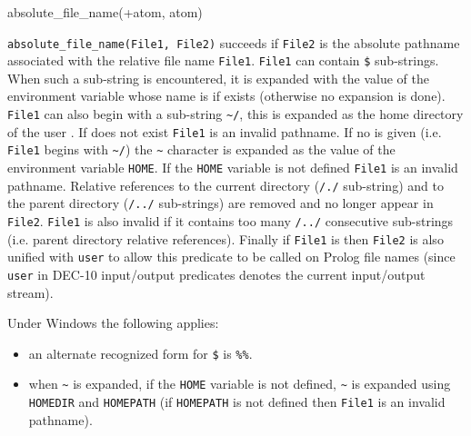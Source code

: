 \subsubsection{\label{absolute-file-name/2}}

\begin{TemplatesOneCol}
absolute\_file\_name(+atom, atom)

\end{TemplatesOneCol}

\Description

\texttt{absolute\_file\_name(File1, File2)} succeeds if \texttt{File2} is
the absolute pathname associated with the relative file name \texttt{File1}.
\texttt{File1} can contain \texttt{\$} sub-strings. When
such a sub-string is encountered, it is expanded with the value of the
environment variable whose name is  if exists
(otherwise no expansion is done). \texttt{File1} can also begin with a
sub-string \texttt{\~{}/}, this is expanded as the home
directory of the user . If
 does not exist \texttt{File1} is an invalid
pathname. If no  is given (i.e. \texttt{File1}
begins with \texttt{\~{}/}) the \texttt{\~{}} character is expanded as the
value of the environment variable \texttt{HOME}. If the \texttt{HOME}
variable is not defined \texttt{File1} is an invalid pathname. Relative
references to the current directory (\texttt{/./} sub-string) and to the
parent directory (\texttt{/../} sub-strings) are removed and no longer
appear in \texttt{File2}. \texttt{File1} is also invalid if it contains too
many \texttt{/../} consecutive sub-strings (i.e. parent directory relative
references). Finally if \texttt{File1} is  then \texttt{File2}
is also unified with \texttt{user} to allow this predicate to be called on
Prolog file names (since \texttt{user} in DEC-10 input/output predicates
denotes the current input/output stream).

Under Windows the following applies: 
\begin{itemize}
\item an alternate recognized form for \texttt{\$} is
  \texttt{\%\%}. 

\item when \texttt{\~{}} is expanded, if the \texttt{HOME} variable is not defined, \texttt{\~{}} is expanded using \texttt{HOMEDIR} and
  \texttt{HOMEPATH} (if \texttt{HOMEPATH} is not defined then \texttt{File1}
  is an invalid pathname).
\end{itemize}

